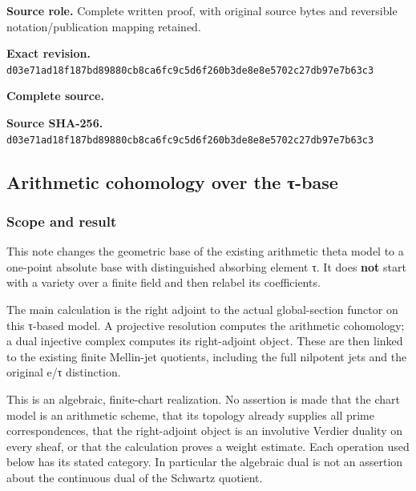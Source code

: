 \documentclass{article}
\begin{document}
\maketitle
\begingroup
\sloppy
\small
\makeatletter
\let\EndpointOriginalTagForm\tagform@
\def\tagform@#1{\EndpointOriginalTagForm{TauBase\, #1}}
\makeatother

\noindent\textbf{Source role.} Complete written proof, with original source bytes and reversible notation/publication mapping retained.\par
\noindent\textbf{Exact revision.} \nolinkurl{d03e71ad18f187bd89880cb8ca6fc9c5d6f260b3de8e8e5702c27db97e7b63c3}\par
\noindent\textbf{Complete source.} \par
\noindent\textbf{Source SHA-256.} \nolinkurl{d03e71ad18f187bd89880cb8ca6fc9c5d6f260b3de8e8e5702c27db97e7b63c3}\par\medskip
\subsection{Arithmetic cohomology over the τ-base}\label{endpoint-tau_base--arithmetic-cohomology-over-the-ux3c4-base}

\subsubsection{Scope and result}\label{endpoint-tau_base--scope-and-result}

This note changes the geometric base of the existing arithmetic theta model to a one-point absolute base with distinguished absorbing element τ. It does \textbf{not} start with a variety over a finite field and then relabel its coefficients.

The main calculation is the right adjoint to the actual global-section functor on this τ-based model. A projective resolution computes the arithmetic cohomology; a dual injective complex computes its right-adjoint object. These are then linked to the existing finite Mellin-jet quotients, including the full nilpotent jets and the original e/τ distinction.

This is an algebraic, finite-chart realization. No assertion is made that the chart model is an arithmetic scheme, that its topology already supplies all prime correspondences, that the right-adjoint object is an involutive Verdier duality on every sheaf, or that the calculation proves a weight estimate. Each operation used below has its stated category. In particular the algebraic dual is not an assertion about the continuous dual of the Schwartz quotient.
\end{document}
